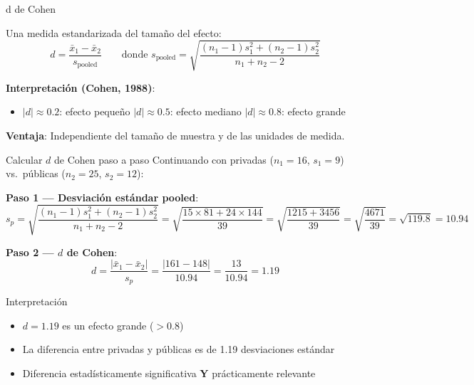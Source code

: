 \documentclass[aspectratio=169, 11pt]{beamer}
\begin{document}
\begin{frame}{d de Cohen}
\begin{definition}[d de Cohen]
Una medida estandarizada del tamaño del efecto:
\[
d = \frac{\bar{x}_1 - \bar{x}_2}{s_{\text{pooled}}} \qquad \text{donde } s_{\text{pooled}} = \sqrt{\frac{(n_1 - 1)s_1^2 + (n_2 - 1)s_2^2}{n_1 + n_2 - 2}}
\]
\end{definition}

\vspace{0.2cm}
\textbf{Interpretación (Cohen, 1988)}:
\begin{itemize}
  \item $|d| \approx 0.2$: efecto \alert{pequeño} \quad $|d| \approx 0.5$: efecto \alert{mediano} \quad $|d| \approx 0.8$: efecto \alert{grande}
\end{itemize}

\vspace{0.2cm}
\textbf{Ventaja}: Independiente del tamaño de muestra y de las unidades de medida.
\end{frame}

\begin{frame}{Calcular $d$ de Cohen paso a paso}
\small
Continuando con privadas ($n_1 = 16$, $s_1 = 9$) vs.\ p\'ublicas ($n_2 = 25$, $s_2 = 12$):

\vspace{0.2cm}
\textbf{Paso 1 --- Desviaci\'on est\'andar pooled}:
\[
s_p = \sqrt{\frac{(n_1-1)s_1^2 + (n_2-1)s_2^2}{n_1+n_2-2}} = \sqrt{\frac{15 \times 81 + 24 \times 144}{39}} = \sqrt{\frac{1215 + 3456}{39}} = \sqrt{\frac{4671}{39}} = \sqrt{119.8} = 10.94
\]

\textbf{Paso 2 --- $d$ de Cohen}:
\[
d = \frac{|\bar{x}_1 - \bar{x}_2|}{s_p} = \frac{|161 - 148|}{10.94} = \frac{13}{10.94} = \boxed{1.19}
\]

\vspace{0.2cm}
\begin{block}{Interpretaci\'on}
\begin{itemize}
  \item $d = 1.19$ es un efecto \alert{grande} ($> 0.8$)
  \item La diferencia entre privadas y p\'ublicas es de 1.19 desviaciones est\'andar
  \item Diferencia estad\'isticamente significativa \textbf{Y} pr\'acticamente relevante
\end{itemize}
\end{block}
\end{frame}
\end{document}
